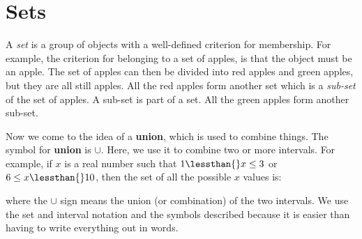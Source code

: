    \section{Sets}
            \nopagebreak
      \label{m38346*id171586}A \textsl{set} is a group of objects with a well-defined criterion for membership. For example, the criterion for belonging to a set of apples, is that the object must be an apple. The set of apples can then be divided into red apples and green apples, but they are all still apples. All the red apples form another set which is a \textsl{sub-set} of the set of apples. A sub-set is part of a set. All the green apples form another sub-set.\par 
      \label{m38346*id171604}Now we come to the idea of a \textbf{union}, which is used to combine things. The symbol for \textbf{union} is $\cup $. Here, we use it to combine two or more intervals. For example, if $x$ is a real number such that $1\lessthan{}x\le 3$ or $6\le x\lessthan{}10$\hspace{1ex}, then the set of all the possible $x$ values is:\par 
      \label{m38346*uid1}\nopagebreak\noindent{}
        \settowidth{\mymathboxwidth}{\begin{equation}
    \left(1,3\right]\cup \left[6,10\right)\tag{1}
      \end{equation}
    }
    \ifthenelse{\lengthtest{\mymathboxwidth < \columnwidth}}{%
    \begin{equation}
    \left(1,3\right]\cup \left[6,10\right)\tag{1}
      \end{equation}
    }{%
    \setlength{\mymathboxwidth}{\columnwidth}
      \addtolength{\mymathboxwidth}{-48pt}
    \par\vspace{12pt}\noindent\begin{minipage}{\columnwidth}
    \parbox[t]{\mymathboxwidth}{\large$
    \left(1,3\right]\cup \left[6,10\right)$}\hfill
    \parbox[t]{48pt}{\raggedleft 
    (1)}
    \end{minipage}\vspace{12pt}\par
    }%
      \label{m38346*id171079}where the $\cup $ sign means the union (or combination) of the two intervals. We use the set and interval notation and the symbols described because it is easier than having to write everything out in words.\par 

